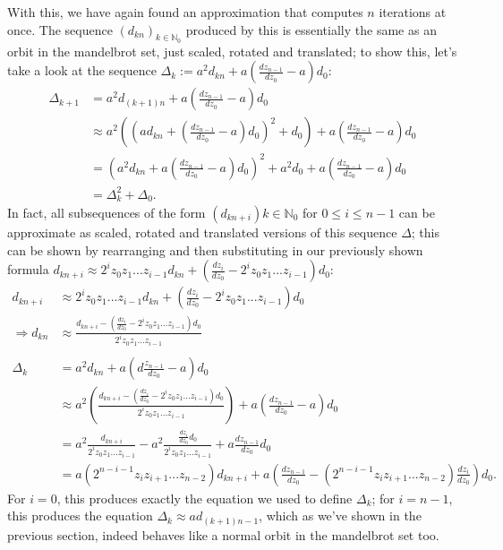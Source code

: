 \documentclass[12pt,a4paper]{article}
\begin{document}
With this, we have again found an approximation that computes $n$ iterations at once. The sequence $(d_{kn})_{k\in\mathbb{N}_0}$ produced by this is essentially the same as an orbit in the mandelbrot set, just scaled, rotated and translated; to show this, let's take a look at the sequence $\Delta_k:=a^2d_{kn}+a(\frac{dz_{n-1}}{dz_0}-a)d_0$:
\begin{align*}
	\Delta_{k+1}&=a^2d_{(k+1)n}+a(\frac{dz_{n-1}}{dz_0}-a)d_0\\
	&\approx a^2((ad_{kn}+(\frac{dz_{n-1}}{dz_0}-a)d_0)^2+d_0)+a(\frac{dz_{n-1}}{dz_0}-a)d_0\\
	&= (a^2d_{kn}+a(\frac{dz_{n-1}}{dz_0}-a)d_0)^2+a^2d_0+a(\frac{dz_{n-1}}{dz_0}-a)d_0\\
	&= \Delta_k^2+\Delta_0.
\end{align*}
In fact, all subsequences of the form $(d_{kn+i})k\in\mathbb{N}_0$ for $0\leq i\leq n-1$ can be approximate as scaled, rotated and translated versions of this sequence $\Delta$; this can be shown by rearranging and then substituting in our previously shown formula $d_{kn+i}\approx 2^iz_0z_1...z_{i-1}d_{kn}+(\frac{dz_i}{dz_0}-2^iz_0z_1...z_{i-1})d_0$:
\begin{align*}
	d_{kn+i}&\approx 2^iz_0z_1...z_{i-1}d_{kn}+(\frac{dz_i}{dz_0}-2^iz_0z_1...z_{i-1})d_0\\
	\Rightarrow d_{kn}&\approx\frac{d_{kn+i}-(\frac{dz_i}{dz_0}-2^iz_0z_1...z_{i-1})d_0}{2^iz_0z_1...z_{i-1}}
	\\\\
	\Delta_k&=a^2d_{kn}+a(d\frac{z_{n-1}}{dz_0}-a)d_0\\
	&\approx a^2(\frac{d_{kn+i}-(\frac{dz_i}{dz_0}-2^iz_0z_1...z_{i-1})d_0}{2^iz_0z_1...z_{i-1}})+a(\frac{dz_{n-1}}{dz_0}-a)d_0\\
	&=a^2\frac{d_{kn+i}}{2^iz_0z_1...z_{i-1}}-a^2\frac{\frac{dz_i}{dz_0}d_0}{2^iz_0z_1...z_{i-1}}+a\frac{dz_{n-1}}{dz_0}d_0\\
	&=a(2^{n-i-1}z_iz_{i+1}...z_{n-2})d_{kn+i}+a(\frac{dz_{n-1}}{dz_0}-(2^{n-i-1}z_iz_{i+1}...z_{n-2})\frac{dz_i}{dz_0})d_0.
\end{align*}
For $i=0$, this produces exactly the equation we used to define $\Delta_k$; for $i=n-1$, this produces the equation $\Delta_k\approx ad_{(k+1)n-1}$, which as we've shown in the previous section, indeed behaves like a normal orbit in the mandelbrot set too.
\end{document}
